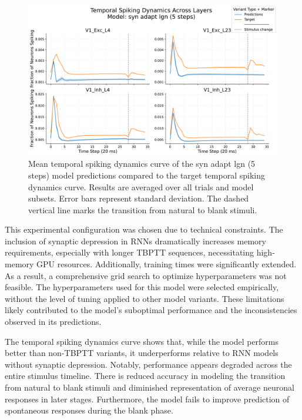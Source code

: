 \begin{figure}
    \centering
    \includegraphics[width=\linewidth]{img/plots/separate_model_synchrony_curve_syn_only_lgn_5_evaluation.pdf}
    \caption{Mean temporal spiking dynamics curve of the syn adapt lgn (5 steps) model predictions compared to the target temporal spiking dynamics curve. Results are averaged over all trials and model subsets. Error bars represent standard deviation. The dashed vertical line marks the transition from natural to blank stimuli.}
    \label{fig:synchrony_curve_syn_adapt_lgn_5}
\end{figure}

This experimental configuration was chosen due to technical constraints. The inclusion of synaptic depression in RNNs dramatically increases memory requirements, especially with longer TBPTT sequences, necessitating high-memory GPU resources. Additionally, training times were significantly extended. As a result, a comprehensive grid search to optimize hyperparameters was not feasible. The hyperparameters used for this model were selected empirically, without the level of tuning applied to other model variants. These limitations likely contributed to the model's suboptimal performance and the inconsistencies observed in its predictions.

The temporal spiking dynamics curve shows that, while the model performs better than non-TBPTT variants, it underperforms relative to RNN models without synaptic depression. Notably, performance appears degraded across the entire stimulus timeline. There is reduced accuracy in modeling the transition from natural to blank stimuli and diminished representation of average neuronal responses in later stages. Furthermore, the model fails to improve prediction of spontaneous responses during the blank phase.

